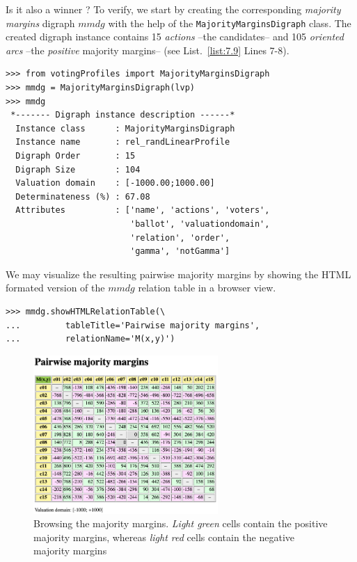 Is it also a \Condorcet winner ? To verify, we start by creating the corresponding \emph{majority margins} digraph $mmdg$ with the help of the \texttt{MajorityMarginsDigraph} class. The created digraph instance contains 15 \emph{actions} --the candidates-- and 105 \emph{oriented arcs} --the \emph{positive} majority margins-- (see List.~\vref{list:7.9} Lines 7-8).
\begin{lstlisting}[caption={A majority margins digraph constructed from a linear voting profile},label=list:7.9]
>>> from votingProfiles import MajorityMarginsDigraph
>>> mmdg = MajorityMarginsDigraph(lvp)
>>> mmdg
 *------- Digraph instance description ------*
  Instance class      : MajorityMarginsDigraph
  Instance name       : rel_randLinearProfile
  Digraph Order       : 15
  Digraph Size        : 104
  Valuation domain    : [-1000.00;1000.00]
  Determinateness (%) : 67.08
  Attributes          : ['name', 'actions', 'voters',
                         'ballot', 'valuationdomain',
                         'relation', 'order',
                         'gamma', 'notGamma']
\end{lstlisting}

We may visualize the resulting pairwise majority margins by showing the HTML formated version of the $mmdg$ relation table in a browser view.
\begin{lstlisting}
>>> mmdg.showHTMLRelationTable(\
...         tableTitle='Pairwise majority margins',
...         relationName='M(x,y)')
\end{lstlisting}
\begin{figure}[ht]
\sidecaption[t]
\includegraphics[width=7cm]{Figures/7-4-majorityMargins.png}
\caption{Browsing the majority margins. \emph{Light green} cells contain the positive majority margins, whereas \emph{light red} cells contain the negative majority margins}
\label{fig:7.4}       %
\end{figure}

